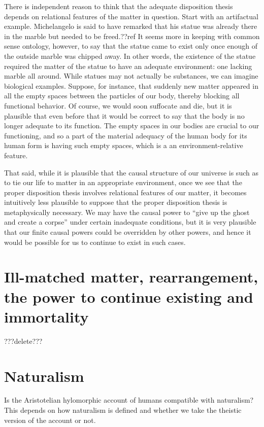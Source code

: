 There is independent reason to think that the adequate disposition thesis depends on relational features of the matter in 
question. Start with an artifactual example. Michelangelo is said to have remarked that his statue was already there in the 
marble but needed to be freed.??ref It seems more in keeping with common sense ontology, however, to say that the statue came 
to exist only once enough of the outside marble was chipped away. In other words, the existence of the statue required the 
matter of the statue to have an adequate environment: one lacking marble all around. While statues may not actually be substances,
we can imagine biological examples. Suppose, for instance, that suddenly new matter appeared in all the empty spaces between the particles of our body, thereby blocking all functional behavior. Of course, we would soon suffocate and die, but it is plausible
that even before that it would be correct to say that the body is no longer adequate to its function. The empty spaces
in our bodies are crucial to our functioning, and so a part of the material adequacy of the human body for its human form 
is having such empty spaces, which is a an environment-relative feature.

That said, while it is plausible that the causal structure of our universe is such as to tie our life to matter in an
appropriate environment, once we see that the proper disposition thesis involves relational features of our matter, it 
becomes intuitively less plausible to suppose that the proper disposition thesis is metaphysically necessary. We may have 
the causal power to ``give up the ghost and create a corpse'' under certain inadequate conditions, but it is very plausible
that our finite causal powers could be overridden by other powers, and hence it would be possible for us to continue to 
exist in such cases. 

\section{Ill-matched matter, rearrangement, the power to continue existing and immortality}
???delete???

\section{Naturalism}
Is the Aristotelian hylomorphic account of humans compatible with naturalism? This depends on how naturalism
is defined and whether we take the theistic version of the account or not.

